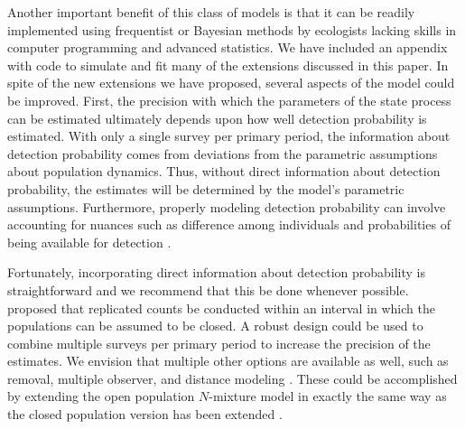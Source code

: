 \documentclass[12pt]{article}
\begin{document}
Another important benefit of this class of models is that it can be
readily implemented using frequentist or Bayesian methods by
ecologists lacking skills in computer programming and advanced
statistics. We have included an appendix with code to
simulate and fit many of the extensions discussed in this paper.
In spite of the new extensions we have proposed, several aspects of
the model could be improved. First, the precision with which the
parameters of the state process can be estimated ultimately depends
upon how well detection probability is estimated. With
only a single survey per primary period, the information about
detection probability comes from deviations from the parametric
assumptions about population dynamics. Thus, without direct information
about detection probability, the estimates will be determined by the
model's parametric assumptions. Furthermore, properly modeling detection
probability can involve accounting for nuances such as difference
among individuals and probabilities of being available for detection
\citep{nichols_etal:2009}.

Fortunately, incorporating direct information about detection probability 
is straightforward and we recommend that this be done whenever
possible. \citet{dail_madsen:2011} proposed that
replicated counts be conducted within an interval in which the populations can 
be assumed to be closed. A robust design \citep{pollock:1982} could be 
used to combine multiple surveys per
primary period to increase the precision of the estimates. We envision
that multiple other options are available as well, such as removal,
multiple observer, and distance modeling \citep{williams_etal:2002}. These could be
accomplished by extending the open population $N$-mixture model
in exactly the same way as the closed population version has been
extended \citep[e.g.,][]{royle_etal:2004}.
\end{document}

